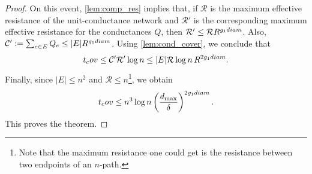 \documentclass[10pt,a4paper]{amsart}
\newcommand{\cov}{\textnormal{cov}}
\newcommand{\diam}{\textnormal{diam}}
\newcommand{\mc}{\mathcal{C}}
\newcommand{\mr}{\mathcal{R}}
\begin{document}
\begin{proof}
On this event, \cref{lem:comp_res} implies that, if $\mr$ is the maximum effective resistance of the unit-conductance network and $\mr'$ is the corresponding maximum effective resistance for the conductances $Q$, then $\mr'\le \mr R^{g_1\diam}$. Also, $\mc':=\sum_{e\in E}Q_e\le |E|R^{g_1\diam}$. Using \cref{lem:cond_cover}, we conclude that
\[
t_\cov
\le
\mc'\mr'\log n
\le
|E|\mr\log n\,R^{2g_1\diam}.
\]
Finally, since $|E|\le n^2$ and $\mr\le n$\footnote{Note that the maximum resistance one could get is the resistance between two endpoints of an $n$-path.}, we obtain
\[
t_\cov
\le
n^3\log n
\left(\frac{d_{\max}}{\delta}\right)^{2g_1\diam}.
\]
This proves the theorem.
\end{proof}
\end{document}
